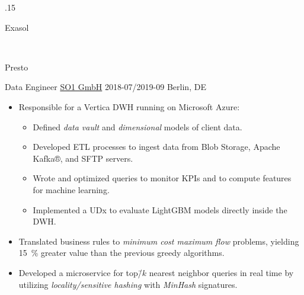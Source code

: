 \documentclass[%
version=last,%
fontsize=11pt,%
paper=A4,%
headinclude=false,%
footinclude=false,%
headlines=0,%
footlines=0,%
areasetadvanced,%
toc=bibnumbered,%
]{scrartcl}%
\begin{document}
\begin{minipage}[t]{0.575\textwidth}
{\begin{minipagebox}[16pt]{.15\linewidth}
\begin{tcolorbox}[remember as=Exasol]
        Exasol
      \end{tcolorbox}%
      \\%
      \begin{tcolorbox}[remember as=Presto]
        Presto
      \end{tcolorbox}%
    \end{minipagebox}%
    \vspace{\baselineskip}
  }

  \WorkEntry%
  {Data Engineer}%
  {\href{https://www.so1.ai/en/}{SO1 GmbH}}%
  {2018-07/2019-09}%
  {Berlin, DE}%
  {%
    \begin{itemize}[nosep,leftmargin=*]
    \item Responsible for a Vertica DWH running on Microsoft Azure:
      \begin{itemize}[nosep]
      \item Defined \emph{data vault} and \emph{dimensional} models of client
        data.
      \item Developed ETL processes to ingest data from Blob Storage, Apache
        Kafka®, and SFTP servers.
      \item Wrote and optimized queries to monitor KPIs and to compute features
        for machine learning.
      \item Implemented a UDx to evaluate LightGBM models directly inside the
        DWH\@.
      \end{itemize}
    \item Translated business rules to \emph{minimum cost maximum flow}
      problems, yielding \SI{15}{\percent} greater value than the previous
      greedy algorithms.
    \item Developed a microservice for top\=/\(k\) nearest neighbor queries in
      real time by utilizing \emph{locality\-/sensitive hashing} with
      \emph{MinHash} signatures.
    \end{itemize}
  }


\end{minipage}
\end{document}
